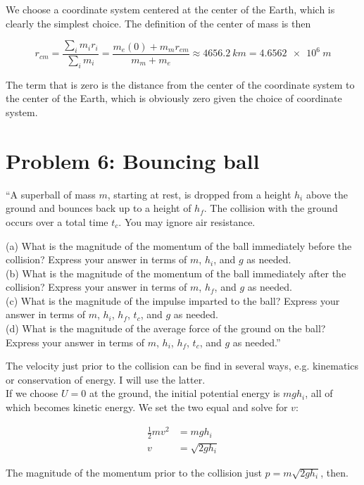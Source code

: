 \documentclass[12pt,a4paper]{report}
\begin{document}
We choose a coordinate system centered at the center of the Earth, which is clearly the simplest choice. The definition of the center of mass is then

\begin{equation}
r_{cm} = \frac{\sum_i m_i r_i}{\sum_i m_i} = \frac{m_e (0) + m_m r_{em}}{m_m + m_e} \approx \SI{4656.2}{km} = \SI{4.6562e6}{m}
\end{equation}

The term that is zero is the distance from the center of the coordinate system to the center of the Earth, which is obviously zero given the choice of coordinate system.

\section{Problem 6: Bouncing ball}

``A superball of mass $m$, starting at rest, is dropped from a height $h_i$ above the ground and bounces back up to a height of $h_f$. The collision with the ground occurs over a total time $t_c$. You may ignore air resistance.

(a) What is the magnitude of the momentum of the ball immediately before the collision? Express your answer in terms of $m$, $h_i$, and $g$ as needed.\\
(b) What is the magnitude of the momentum of the ball immediately after the collision? Express your answer in terms of $m$, $h_f$, and $g$ as needed.\\
(c) What is the magnitude of the impulse imparted to the ball? Express your answer in terms of $m$, $h_i$, $h_f$, $t_c$, and $g$ as needed.\\
(d) What is the magnitude of the average force of the ground on the ball? Express your answer in terms of $m$, $h_i$, $h_f$, $t_c$, and $g$ as needed.''

The velocity just prior to the collision can be find in several ways, e.g. kinematics or conservation of energy. I will use the latter.\\
If we choose $U = 0$ at the ground, the initial potential energy is $m g h_i$, all of which becomes kinetic energy. We set the two equal and solve for $v$:

\begin{align}
\frac{1}{2} m v^2 &= m g h_i\\
v &= \sqrt{2 g h_i}
\end{align}

The magnitude of the momentum prior to the collision just $p = m \sqrt{2 g h_i}$, then.
\end{document}
